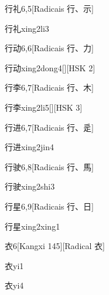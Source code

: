 \begin{entry}{行礼}{6,5}[Radicais ⾏、⽰]
  \begin{phonetics}{行礼}{xing2li3}
  \end{phonetics}
\end{entry}

\begin{entry}{行动}{6,6}[Radicais ⾏、⼒]
  \begin{phonetics}{行动}{xing2dong4}[][HSK 2]
  \end{phonetics}
\end{entry}

\begin{entry}{行李}{6,7}[Radicais ⾏、⽊]
  \begin{phonetics}{行李}{xing2li5}[][HSK 3]
  \end{phonetics}
\end{entry}

\begin{entry}{行进}{6,7}[Radicais ⾏、⾡]
  \begin{phonetics}{行进}{xing2jin4}
  \end{phonetics}
\end{entry}

\begin{entry}{行驶}{6,8}[Radicais ⾏、⾺]
  \begin{phonetics}{行驶}{xing2shi3}
  \end{phonetics}
\end{entry}

\begin{entry}{行星}{6,9}[Radicais ⾏、⽇]
  \begin{phonetics}{行星}{xing2xing1}
  \end{phonetics}
\end{entry}

\begin{entry}{衣}{6}[Kangxi 145][Radical ⾐]
  \begin{phonetics}{衣}{yi1}
  \end{phonetics}
  \begin{phonetics}{衣}{yi4}
  \end{phonetics}
\end{entry}

